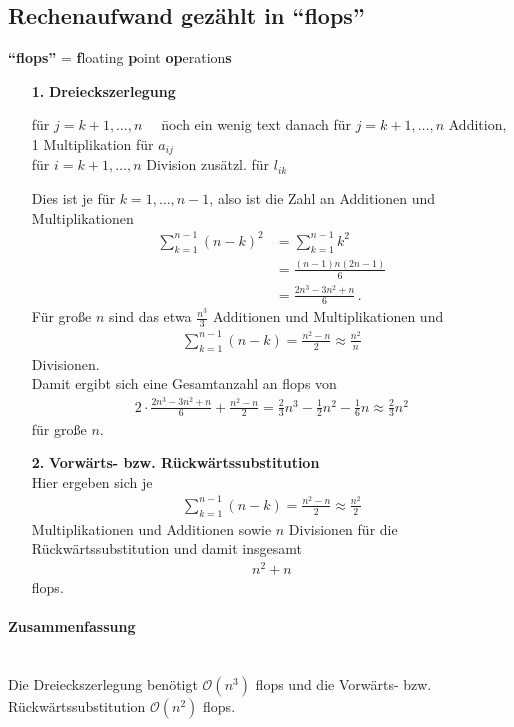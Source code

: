 \documentclass[ngerman,fontsize=11pt, paper=a4, parskip=half, titlepage=true, toc=bib]{scrbook}
\theoremstyle{definition}
\theoremstyle{plain}
\newcommand{\subsectione}[1]{\subsection{#1} \addtocounter{Def}{1}}
\begin{document}
\subsectione{Rechenaufwand gezählt in \enquote{flops}} 
\textbf{\enquote{flops} }= \textbf{f}loating \textbf{p}oint \textbf{op}eration\textbf{s} \\
\begin{enumerate}
\item[\textbf{1.}] \textbf{Dreieckszerlegung} 
  \begin{tabbing}
    für $j=k+1, \dots, n\quad$ \= noch ein wenig text danach \kill
    für $j=k+1, \dots, n$  Addition, 1 Multiplikation für $a_{ij}$ \\
    für $i=k+1, \dots, n$  Division zusätzl. für $ l_{ik}$
  \end{tabbing}
  Dies ist je für $k=1, \dots, n-1$, also ist die Zahl an Additionen und Multiplikationen
  \begin{align*}
    \sum_{k=1}^{n-1}(n-k)^2 &= \sum_{k=1}^{n-1}k^2 \\
                            &= \frac{(n-1)n(2n-1)}{6} \\
                            &= \frac{2n^3-3n^2+n}{6}\, .
  \end{align*}
  Für große $n$ sind das etwa $\frac{n^3}{3}$ Additionen und Multiplikationen und
  \begin{gather*}
    \sum_{k=1}^{n-1} (n-k) = \frac{n^2-n}{2} \approx \frac{n^2}{n}
  \end{gather*}
  Divisionen. \\
  Damit ergibt sich eine Gesamtanzahl an flops von
  \begin{gather*}
    2\cdot\frac{2n^3-3n^2+n}{6} + \frac{n^2-n}{2} 
    = \frac{2}{3} n^3 - \frac{1}{2}n^2 - \frac{1}{6} n
    \approx \frac{2}{3}n^2
  \end{gather*}
  für große $n$.
  
\item[\textbf{2.}] \textbf{Vorwärts- bzw. Rückwärtssubstitution}  \\
  Hier ergeben sich je
  \begin{gather*}
    \sum_{k=1}^{n-1} (n-k) = \frac{n^2-n}{2} \approx \frac{n^2}{2}
  \end{gather*}
  Multiplikationen und Additionen sowie 
  $n$ Divisionen für die Rückwärtssubstitution und damit insgesamt \begin{gather*}n^2+n\end{gather*} flops.	
\end{enumerate}
\paragraph{Zusammenfassung}~ \\
Die Dreieckszerlegung benötigt $\mathcal{O}(n^3)$ flops und 
die Vorwärts- bzw. Rückwärtssubstitution $\mathcal{O}(n^2)$ flops.
\end{document}
